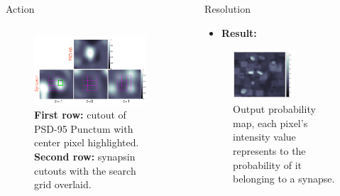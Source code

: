 \documentclass[final, table]{beamer}
\newlength{\sepwid}
\newlength{\onecolwid}
\newlength{\twocolwid}
\begin{document}
\begin{frame}[t]
\begin{columns}[t]
\begin{column}{\twocolwid}
\begin{block}{Action}
\begin{columns}[t]
\begin{column}{\onecolwid}
\begin{figure}[!h]
\centering
\includegraphics[width=1\textwidth]{figs/gridsearch}
\caption{\textbf{First row:} cutout of PSD-95 Punctum with center pixel highlighted. \textbf{Second row:} synapsin cutouts with the search grid overlaid.} 
\end{figure} 


\end{column}
\end{columns} 
\end{block}
\end{column} 

\begin{column}{\sepwid}\end{column}  %
\begin{column}{\onecolwid}



\begin{block}{Resolution} 
\begin{itemize} 
\item \textbf{Result:} 
\end{itemize}  

\begin{figure}[!h]
\centering
\includegraphics[width=0.6\textwidth]{figs/silane_output}
\caption{Output probability map, each pixel's intensity value represents to the probability of it belonging to a synapse. }
\end{figure}




\end{block}
\end{column}
\end{columns}
\end{frame}
\end{document}
